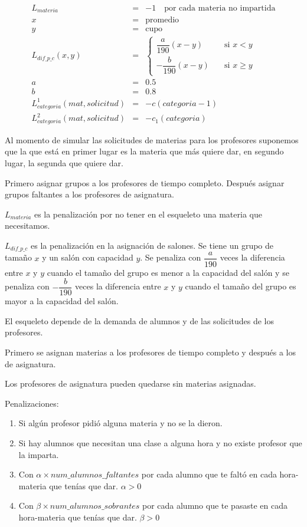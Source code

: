 \begin{eqnarray*}
L_{materia} &=& -1 \,\,\,\,\,\,  \text{por cada materia no impartida}\\
x &=& \text{promedio}\\
y &=& \text{cupo}\\
L_{dif\_p\_c} (x,y) &=& \begin{cases}
    \dfrac{a}{190} (x-y)  & \quad \text{si } x<y\\
    - \dfrac{b}{190} (x-y)  & \quad \text{si } x\geqslant y
  \end{cases}\\
a &=& 0.5\\
b &=& 0.8\\
L_{categoria}^{1} (mat,solicitud) &=& -c(categoria - 1)\\
L_{categoria}^{2} (mat,solicitud) &=& -c_{1}(categoria)
\end{eqnarray*}

Al momento de simular las solicitudes de materias para los profesores suponemos que la que está en primer lugar es la materia que más quiere dar, en segundo lugar, la segunda que quiere dar.

Primero asignar grupos a los profesores de tiempo completo. Después asignar grupos faltantes a los profesores de asignatura.

$L_{materia}$ es la penalización por no tener en el esqueleto una materia que necesitamos.

$L_{dif\_p\_c}$ es la penalización en la asignación de salones. Se tiene un grupo de tamaño $x$ y un salón con capacidad $y$. Se penaliza con $\dfrac{a}{190}$ veces la diferencia entre $x$ y $y$ cuando el tamaño del grupo es menor a la capacidad del salón y se penaliza con $-\dfrac{b}{190}$ veces la diferencia entre $x$ y $y$ cuando el tamaño del grupo es mayor a la capacidad del salón.

El esqueleto depende de la demanda de alumnos y de las solicitudes de los profesores.

Primero se asignan materias a los profesores de tiempo completo y después a los de asignatura.

Los profesores de asignatura pueden quedarse sin materias asignadas.

Penalizaciones:

\begin{enumerate}
\item Si algún profesor pidió alguna materia y no se la dieron.

\item Si hay alumnos que necesitan una clase a alguna hora y no existe profesor que la imparta.

\item Con $\alpha \times num\_alumnos\_faltantes$ por cada alumno que te faltó en cada hora-materia que tenías que dar. $\alpha > 0$

\item Con $\beta \times num\_alumnos\_sobrantes$ por cada alumno que te pasaste en cada hora-materia que tenías que dar. $\beta > 0$

\end{enumerate}


